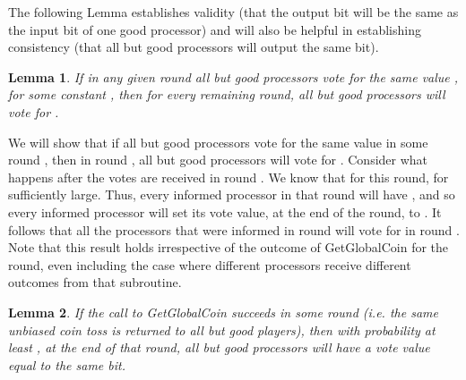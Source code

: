 \documentclass[letterpaper,11pt]{article}
\newtheorem{lemma}{Lemma}
\newcommand{\sq}{\hbox{\rlap{}}}
\newcommand{\qed}{\hspace*{\fill}\sq}
\newenvironment{proof}{\noindent {\bf Proof:}}{\qed\par\vskip 4mm\par}
\begin{document}
The following Lemma establishes validity (that the output bit will be the same as the input bit of one good processor) and will also be helpful in establishing consistency (that all but  good processors will output the same bit).

\begin{lemma} \label{l:validity}
If in any given round all but  good processors vote for the same value , for some constant , then for every remaining round, all but  good processors will vote for .
\end{lemma}

\begin{proof}
We will show that if all but  good processors vote for the same value  in some round , then in round , all but  good processors will vote for .  Consider what happens after the votes are received in round .  We know that for this round,  for  sufficiently large.  Thus, every informed processor in that round will have , and so every informed processor will set its vote value, at the end of the round, to .  It follows that all the processors that were informed in round  will vote for  in round .  Note that this result holds irrespective of the outcome of GetGlobalCoin for the round, even including the case where different processors receive different outcomes from that subroutine.
\end{proof}

\begin{lemma} \label{l:term}
If the call to GetGlobalCoin succeeds in some round (i.e. the same unbiased coin toss is returned to all but  good players), then with probability at least , at the end of that round, all but  good processors will have a vote value equal to the same bit.
\end{lemma}
\end{document}
